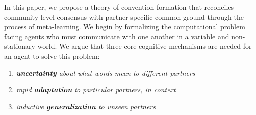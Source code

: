 In this paper, we propose a theory of convention formation that reconciles community-level consensus with partner-specific common ground through the process of meta-learning.
We begin by formalizing the computational problem facing agents who must communicate with one another in a variable and non-stationary world. 
We argue that three core cognitive mechanisms are needed for an agent to solve this problem: 
\begin{enumerate}
\item \emph{\textbf{uncertainty} about what words mean to different partners}
\item \emph{rapid \textbf{adaptation} to particular partners, in context}
\item  \emph{inductive \textbf{generalization} to unseen partners}
\end{enumerate}
